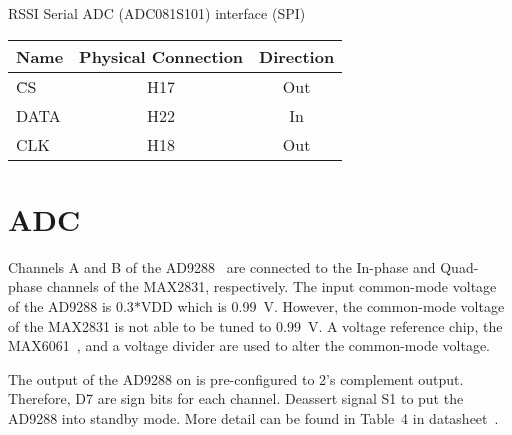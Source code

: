 RSSI Serial ADC (ADC081S101) interface (SPI)
\begin{table}[h]
\centering
\begin{tabular}{|l|c|c|}
	\hline
	{\bf Name} & {\bf Physical Connection} & {\bf Direction}\\ \hline
	\={CS}	& H17 & Out\\ \hline
	DATA	& H22 & In\\ \hline
	CLK		& H18 & Out\\ \hline
\end{tabular}
\end{table}

\clearpage
\section{ADC}
Channels A and B of the AD9288~\cite{AD9288} are connected to the In-phase and Quad-phase channels of the MAX2831, respectively.
The input common-mode voltage of the AD9288 is 0.3$*$VDD which is 0.99~V. However, the common-mode
voltage of the MAX2831 is not able to be tuned to 0.99~V. A voltage reference chip, the MAX6061~\cite{MAX6061},
and a voltage divider are used to alter the common-mode voltage.

The output of the AD9288 on \sdr is pre-configured to 2's complement output. Therefore,
D7 are sign bits for each channel. Deassert signal S1 to put the AD9288 into
standby mode. More detail can be found in Table~4 in datasheet~\cite{AD9288}.

